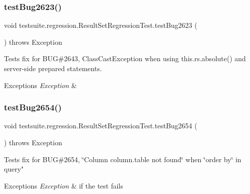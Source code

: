 \subsubsection{\texorpdfstring{test\+Bug2623()}{testBug2623()}}
{\footnotesize\ttfamily void testsuite.\+regression.\+Result\+Set\+Regression\+Test.\+test\+Bug2623 (\begin{DoxyParamCaption}{ }\end{DoxyParamCaption}) throws Exception}

Tests fix for B\+UG\#2643, Class\+Cast\+Exception when using this.\+rs.\+absolute() and server-\/side prepared statements.


\begin{DoxyExceptions}{Exceptions}
{\em Exception} & \\
\hline
\end{DoxyExceptions}
\mbox{\label{classtestsuite_1_1regression_1_1_result_set_regression_test_a32ba87707ddb894483b0813570ec5571}} 
\subsubsection{\texorpdfstring{test\+Bug2654()}{testBug2654()}}
{\footnotesize\ttfamily void testsuite.\+regression.\+Result\+Set\+Regression\+Test.\+test\+Bug2654 (\begin{DoxyParamCaption}{ }\end{DoxyParamCaption}) throws Exception}

Tests fix for B\+UG\#2654, \char`\"{}\+Column \textquotesingle{}column.\+table\textquotesingle{} not found\char`\"{} when \char`\"{}order by\char`\"{} in query"


\begin{DoxyExceptions}{Exceptions}
{\em Exception} & if the test fails \\
\hline
\end{DoxyExceptions}
\mbox{\label{classtestsuite_1_1regression_1_1_result_set_regression_test_a025d8f10b5713673139e324fd77a7482}} 
